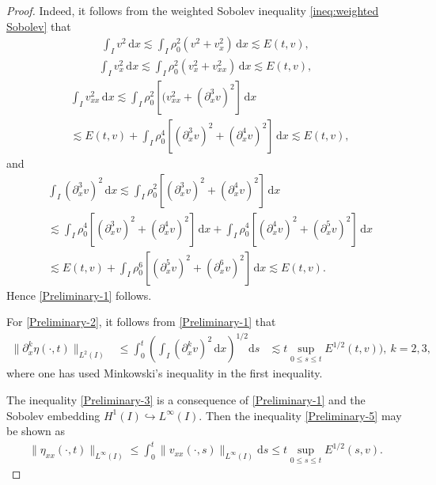 \documentclass[11pt, reqno]{amsart}
\newcommand{\diff}{\mathrm{d}}
\numberwithin{equation}{section}
\begin{document}
\begin{proof}
	Indeed, it follows from the weighted Sobolev inequality \eqref{ineq:weighted Sobolev} that
	\begin{equation*}
		\begin{aligned}
			\int_I v^2\,\diff x\lesssim \int_I\rho_0^2(v^2+v_x^2)\,\diff x\lesssim E(t,v),
		\end{aligned}
	\end{equation*}
	\begin{equation*}
		\begin{aligned}
			\int_I v_x^2\,\diff x\lesssim \int_I\rho_0^2(v_x^2+v_{xx}^2)\,\diff x\lesssim E(t,v),
		\end{aligned}
	\end{equation*}
	\begin{equation*}
		\begin{aligned}
			&\int_I v_{xx}^2\,\diff x\lesssim \int_I\rho_0^2[(v_{xx}^2+(\partial_x^3v)^2]\,\diff x\\
			&\lesssim E(t,v)+\int_I\rho_0^4[(\partial_x^3v)^2+(\partial_x^4v)^2]\,\diff x
			\lesssim E(t,v),
		\end{aligned}
	\end{equation*}
	and
	\begin{equation*}
		\begin{aligned}
			&\int_I (\partial_x^3v)^2\,\diff x\lesssim \int_I\rho_0^2[(\partial_x^3v)^2+(\partial_x^4v)^2]\,\diff x\\
			&\lesssim \int_I\rho_0^4[(\partial_x^3v)^2+(\partial_x^4v)^2]\,\diff x
			+\int_I\rho_0^4[(\partial_x^4v)^2+(\partial_x^5v)^2]\,\diff x\\
			&\lesssim E(t,v)+\int_I\rho_0^6[(\partial_x^5v)^2+(\partial_x^6v)^2]\,\diff x\lesssim E(t,v).
		\end{aligned}
	\end{equation*}
	Hence \eqref{Preliminary-1} follows.
	
	
	For \eqref{Preliminary-2}, it follows from \eqref{Preliminary-1} that
	\begin{equation*}
		\begin{aligned}
			\|\partial_x^k\eta(\cdot,t)\|_{L^2(I)}&\leq \int_0^t\left(\int_I (\partial_x^kv)^2\,\diff x\right)^{1/2}\diff s
			&\lesssim t \sup_{0\leq s\leq t}E^{1/2}(t,v)),\ k=2,3,
		\end{aligned}
	\end{equation*}
	where one has used Minkowski's inequality in the first inequality.
	
	The inequality \eqref{Preliminary-3} is a consequence of \eqref{Preliminary-1} and the Sobolev embedding \(H^1(I)\hookrightarrow L^\infty(I)\). Then the inequality  \eqref{Preliminary-5} may be shown as
	\begin{align*}
		\|\eta_{xx}(\cdot,t)\|_{L^\infty(I)}\leq \int_0^t\|v_{xx}(\cdot,s)\|_{L^\infty(I)}\diff s\leq t\sup_{0\leq s\leq t}E^{1/2}(s,v).
	\end{align*}
\end{proof}
\end{document}
